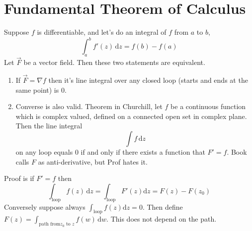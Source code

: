 \documentclass[letter]{article}
\begin{document}
\section{Fundamental Theorem of Calculus} 
Suppose $f$ is differentiable, and let's do an integral of $f$ from $a$ to $b$, 
\[
	\int_a^b f'(z) \, \mathrm{d} z = f(b) - f(a)
\]
Let $\vec{F}$ be a vector field. Then these two statements are equivalent. 
\begin{enumerate}
	\item If $\vec{F} = \nabla f$ then it's line integral over any closed loop (starts and ends at the same point) is $0$. 
	\item Converse is also valid. Theorem in Churchill, let $f$ be a continuous function which is complex valued, defined on a connected open set in complex plane. Then the line integral 
		\[
		\int f \, \mathrm{d} z
		\] on any loop equals $0$ if and only if there exists a function that $F' = f $. Book calls $F$ as anti-derivative, but Prof hates it. 
\end{enumerate}
Proof is if $F' = f$ then 
\[
\int_\text{loop} f(z) \, \mathrm{d} z = \int_\text{loop} F'(z) \mathrm{d}  z = F(z) - F(z_0)
\] 
Conversely suppose always $\int_\text{loop} f(z) \mathrm{d} z = 0$. Then define $F(z ) = \int_{\text{path from} z_0 \text{ to } z} f(w) \, \mathrm{d} w$. This does not depend on the path.
\end{document}
